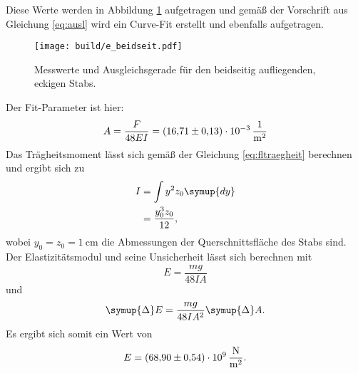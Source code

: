 \noindent Diese Werte werden in Abbildung \ref{fig:plot3} aufgetragen und gemäß der Vorschrift aus Gleichung \eqref{eq:ausl}
wird ein Curve-Fit erstellt und ebenfalls aufgetragen.
\begin{figure}[H]
    \centering
    \texttt{[image: build/e\_beidseit.pdf]}
    \caption{Messwerte und Ausgleichsgerade für den beidseitig aufliegenden, eckigen Stabs.}
    \label{fig:plot3}
\end{figure}
\noindent Der Fit-Parameter ist hier:
\begin{equation}
    A = \frac{F}{48EI} = \SI{16.71\pm0.13e-3}{\per\meter\squared}
\end{equation}
Das Trägheitsmoment lässt sich gemäß der Gleichung \eqref{eq:fltraegheit} berechnen und ergibt sich zu
\begin{align}
    I &= \int y^2z_0 \symup{dy} \\
      &= \frac{y_0^3z_0}{12},
\end{align}
wobei $y_0=z_0=\SI{1}{\centi\meter}$ die Abmessungen der Querschnittsfläche des Stabs sind.
Der Elastizitätsmodul und seine Unsicherheit lässt sich berechnen mit
\begin{equation}
    E=\frac{mg}{48IA}
\end{equation}
und
\begin{equation}
    \symup{\Delta}E=\frac{mg}{48IA^2}\symup{\Delta}A.
\end{equation}
Es ergibt sich somit ein Wert von
\begin{equation}
    E = \SI{68.90\pm0.54e9}{\newton\per\meter\squared}.
\end{equation}
